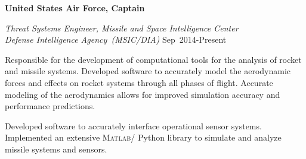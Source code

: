\documentclass[10pt]{article}
\newcommand{\blankline}{\quad\pagebreak[3]}
\providecommand\Matlab{\textsc{Matlab}}
\begin{document}
\blankline

\textbf{United States Air Force, Captain}
\begin{lonelist}

\item[] \textit{Threat Systems Engineer, Missile and Space Intelligence Center \\
				Defense Intelligence Agency~(MSIC/DIA)}
				\hfill {Sep~2014-Present}
		\begin{innerlist}
			\item Responsible for the development of computational tools for the analysis of rocket and missile systems.
			Developed software to accurately model the aerodynamic forces and effects on rocket systems through all phases of flight.
			Accurate modeling of the aerodynamics allows for improved simulation accuracy and performance predictions.
			\item Developed software to accurately interface operational sensor systems.
			Implemented an extensive \Matlab / Python library to simulate and analyze missile systems and sensors. 
		\end{innerlist}
		

\end{lonelist}
\end{document}
